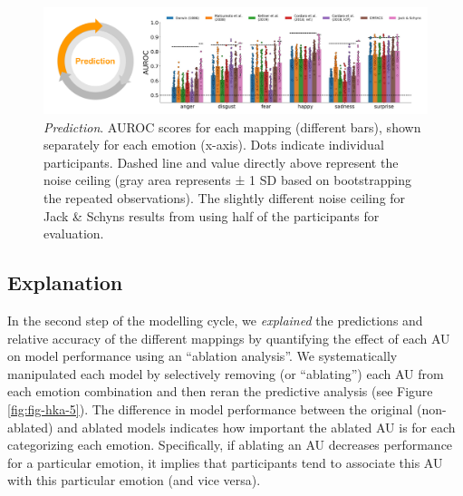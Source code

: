 \documentclass[12pt,american,a4paper,oneside,]{memoir} %
\begin{document}
\begin{figure}
\centering
\includegraphics{_bookdown_files/hypothesis-kernel-analysis-files/figures/figure_4.pdf}
\caption{\label{fig:fig-hka-4}\emph{Prediction}. AUROC scores for each mapping (different bars), shown separately for each emotion (x-axis). Dots indicate individual participants. Dashed line and value directly above represent the noise ceiling (gray area represents ± 1 SD based on bootstrapping the repeated observations). The slightly different noise ceiling for Jack \& Schyns results from using half of the participants for evaluation.}
\end{figure}



\hypertarget{explanation}{%
\subsection{Explanation}\label{explanation}}

In the second step of the modelling cycle, we \emph{explained} the predictions and relative accuracy of the different mappings by quantifying the effect of each AU on model performance using an ``ablation analysis''. We systematically manipulated each model by selectively removing (or ``ablating'') each AU from each emotion combination and then reran the predictive analysis (see Figure \ref{fig:fig-hka-5}). The difference in model performance between the original (non-ablated) and ablated models indicates how important the ablated AU is for each categorizing each emotion. Specifically, if ablating an AU decreases performance for a particular emotion, it implies that participants tend to associate this AU with this particular emotion (and vice versa).
\end{document}
